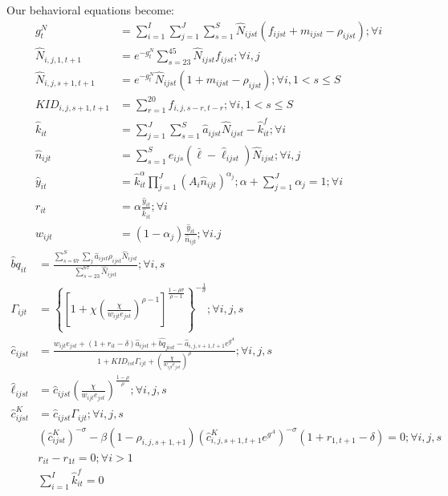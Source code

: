 \documentclass[letterpaper,12pt]{article}
\theoremstyle{definition}
\numberwithin{equation}{section}
\begin{document}
\begin{spacing}{1.5}
	Our behavioral equations become:
	\begin{align}
		g^N_t & = \sum_{i=1}^I \sum_{j=1}^J \sum_{s=1}^S \hat N_{ijst} (f_{ijst}+m_{ijst}-\rho_{ijst}) ; \forall i\\
		\hat N_{i,j,1,t+1} & = e^{-g^N_t}\sum_{s=23}^{45} \hat N_{ijst} f_{ijst} ; \forall i,j\\
		\hat N_{i,j,s+1,t+1} & = e^{-g^N_t}\hat N_{ijst} (1+m_{ijst}-\rho_{ijst}); \forall i, 1<s\le S \\
		KID_{i,j,s+1,t+1} & = \sum_{r=1}^{20} f_{i,j,s-r,t-r}; \forall i, 1<s\le S \\
		\hat k_{it} & = \sum_{j=1}^J \sum_{s=1}^S \hat a_{ijst} \hat N_{ijst} - \hat k_{it}^f; \forall i \\
		\hat n_{ijt} & = \sum_{s=1}^S e_{ijs} (\bar \ell - \hat \ell_{ijst} ) \hat N_{ijst}; \forall i,j \\
		\hat y_{it} & = \hat k_{it}^\alpha \prod_{j=1}^J \left( A_{i} \hat n_{ijt} \right)^{\alpha_j}; \alpha + \sum_{j=1}^J \alpha_j = 1 ; \forall i \\
		r_{it} & = \alpha \frac{\hat y_{it}}{\hat k_{it}}; \forall i \\
		w_{ijt} & = (1-\alpha_j) \frac{\hat y_{it}}{\hat n_{ijt}}; \forall i.j
	\end{align}
	\begin{align}
		\hat bq_{it} & = \frac{\sum_{s=67}^S \sum_j \hat a_{ijst} \rho_{ijst} \hat N_{ijst}}{\sum_{s=23}^{67} \hat N_{ijst}} ; \forall i,s \\
		\Gamma_{ijt} & = \left\{ \left[1 + \chi \left(\frac{\chi}{w_{ijt} e_{jst}}\right)^{\rho-1}\right]^{\tfrac{1-\rho \sigma}{\rho-1}} \right\}^{-\tfrac{1}{\sigma}}; \forall i,j,s \\
    	\hat c_{ijst} & = \frac{w_{ijt} e_{jst} + (1+r_{it}-\delta)\hat a_{ijst} + \hat{bq}_{jist} - \hat a_{i,j,s+1,t+1} e^{g^A}} {1 + KID_{ist}\Gamma_{ijt} + \left(\tfrac{\chi}{w_{ijt}e_{jst}}\right)^\rho}; \forall i,j,s \\
		\hat \ell_{ijst} & = \hat c_{ijst} \left(\frac{\chi}{w_{ijt}e_{jst}}\right)^{\frac{1-\rho}{\rho}} ; \forall i,j,s \\
		\hat c^K_{ijst} & = \hat c_{ijst} \Gamma_{ijt}; \forall i,j,s \\
		& \left({\hat c^K_{ijst}}\right)^{-\sigma} - \beta (1-\rho_{i,j,s+1,+1}) \left(\hat c^K_{i,j,s+1,t+1} e^{g^A}\right)^{-\sigma}(1+r_{1,t+1}-\delta) = 0; \forall i,j,s \\
		& r_{it} - r_{1t} = 0; \forall i>1 \\
		& \sum_{i=1}^I \hat k^f_{it} = 0
	\end{align}



\end{spacing}
\end{document}
